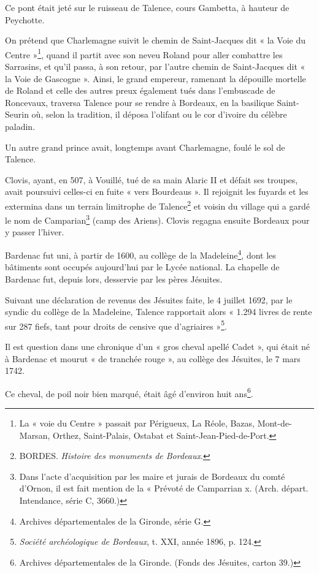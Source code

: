 Ce pont était jeté sur le ruisseau de Talence, cours Gambetta, à hauteur de Peychotte.

On prétend que Charlemagne suivit le chemin de Saint-Jacques dit « la Voie du Centre »\footnote{La « voie du Centre » passait par Périgueux, La Réole, Bazas, Mont-de-Marsan, Orthez, Saint-Palais, Ostabat et Saint-Jean-Pied-de-Port.}, quand il partit avec son neveu Roland pour aller combattre les Sarrasins, et qu'il passa, à son retour, par l'autre chemin de Saint-Jacques dit « la Voie de Gascogne ». Ainsi, le grand empereur, ramenant la dépouille mortelle de Roland et celle des autres preux également tués dans l'embuscade de Roncevaux, traversa Talence pour se rendre à Bordeaux, en la basilique Saint-Seurin où, selon la tradition, il déposa l'olifant ou le cor d'ivoire du célèbre paladin.

Un autre grand prince avait, longtemps avant Charlemagne, foulé le sol de Talence.

Clovis, ayant, en 507, à Vouillé, tué de sa main Alaric II et défait ses troupes, avait poursuivi celles-ci en fuite « vers Bourdeaus ». Il rejoignit les fuyards et les extermina dans un terrain limitrophe de Talence\footnote{BORDES. \textit{Histoire des monuments de Bordeaux}.} et voisin du village qui a gardé le nom de Camparian\footnote{Dans l'acte d'acquisition par les maire et jurais de Bordeaux du comté d'Ornon, il est fait mention de la « Prévoté de Camparrian x. (Arch. départ. Intendance, série C, 3660.)} (camp des Ariens). Clovis regagna ensuite Bordeaux pour y passer l'hiver.

Bardenac fut uni, à partir de 1600, au collège de la Madeleine\footnote{Archives départementales de la Gironde, série G.}, dont les bâtiments sont occupés aujourd'hui par le Lycée national. La chapelle de Bardenac fut, depuis lors, desservie par les pères Jésuites.

Suivant une déclaration de revenus des Jésuites faite, le 4 juillet 1692, par le syndic du collège de la Madeleine, Talence rapportait alors « 1.294 livres de rente sur 287 fiefs, tant pour droits de censive que d'agriaires »\footnote{\textit{Société archéologique de Bordeaux}, t. XXI, année 1896, p. 124.}.

Il est question dans une chronique d'un « gros cheval apellé Cadet », qui était né à Bardenac et mourut « de tranchée rouge », au collège des Jésuites, le 7 mars 1742.

Ce cheval, de poil noir bien marqué, était âgé d'environ huit ans\footnote{Archives départementales de la Gironde. (Fonds des Jésuites, carton 39.)}.

